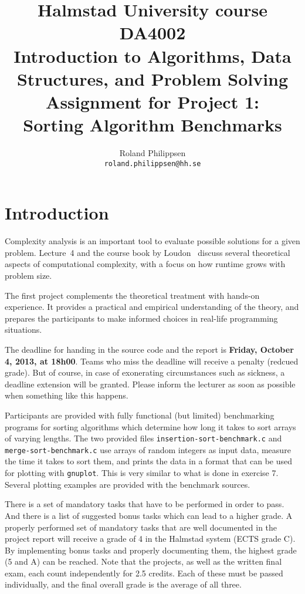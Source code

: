 \documentclass[a4paper,10pt]{article}
\begin{document}
\title{
  {\small
    Halmstad University course DA4002\\
    Introduction to Algorithms, Data Structures, and Problem Solving\\
  }
  Assignment for Project 1:\\
  Sorting Algorithm Benchmarks
}
\author{
  Roland Philippsen\\
  \texttt{roland.philippsen@hh.se}
}
\maketitle



\section*{Introduction}

Complexity analysis is an important tool to evaluate possible solutions for a given problem.
Lecture~4 and the course book by Loudon~\cite{loudon} discuss several theoretical aspects of computational complexity, with a focus on how runtime grows with problem size.

The first project complements the theoretical treatment with hands-on experience.
It provides a practical and empirical understanding of the theory, and prepares the participants to make informed choices in real-life programming situations.

The deadline for handing in the source code and the report is \textbf{Friday, October 4, 2013, at 18h00}.
Teams who miss the deadline will receive a penalty (redcued grade).
But of course, in case of exonerating circumstances such as sickness, a deadline extension will be granted.
Please inform the lecturer as soon as possible when something like this happens.

Participants are provided with fully functional (but limited) benchmarking programs for sorting algorithms which determine how long it takes to sort arrays of varying lengths.
The two provided files \texttt{insertion-sort-benchmark.c} and \texttt{merge\--sort\--benchmark.c} use arrays of random integers as input data, measure the time it takes to sort them, and prints the data in a format that can be used for plotting with \texttt{gnuplot}.
This is very similar to what is done in exercise 7.
Several plotting examples are provided with the benchmark sources.

There is a set of mandatory tasks that have to be performed in order to pass.
And there is a list of suggested bonus tasks which can lead to a higher grade.
A properly performed set of mandatory tasks that are well documented in the project report will receive a grade of 4 in the Halmstad system (ECTS grade C).
By implementing bonus tasks and properly documenting them, the highest grade (5 and A) can be reached.
Note that the projects, as well as the written final exam, each count independently for 2.5 credits.
Each of these must be passed individually, and the final overall grade is the average of all three.
\end{document}
